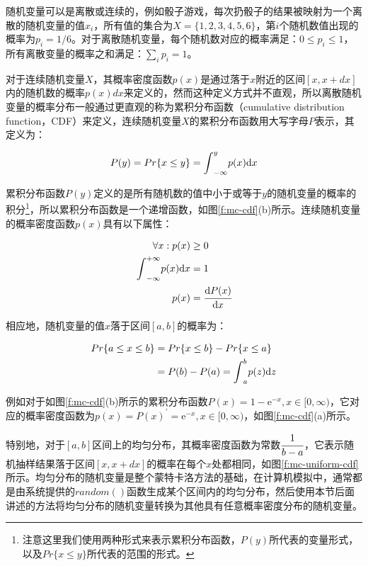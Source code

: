 随机变量可以是离散或连续的，例如骰子游戏，每次扔骰子的结果被映射为一个离散的随机变量的值$x_i$，所有值的集合为$X=\{1,2,3,4,5,6\}$，第$i$个随机数值出现的概率为$p_i=1/6$。对于离散随机变量，每个随机数对应的概率满足：$0\leq p_i \leq 1$，所有离散变量的概率之和满足：$\sum_i p_i=1$。

对于连续随机变量$X$，其概率密度函数$p(x)$是通过落于$x$附近的区间$[x,x+dx]$内的随机数的概率$p(x)dx$来定义的，然而这种定义方式并不直观，所以离散随机变量的概率分布一般通过更直观的称为累积分布函数（cumulative distribution function，CDF）来定义，连续随机变量$X$的累积分布函数用大写字母$P$表示，其定义为：

\begin{equation}
	P(y)=Pr\{x\leq y\}={\rm \int}_{-\infty}^{y}p(x){\rm d}x
\end{equation}

\noindent 累积分布函数$P(y)$定义的是所有随机数的值中小于或等于$y$的随机变量的概率的积分\footnote{注意这里我们使用两种形式来表示累积分布函数，$P(y)$所代表的变量形式，以及$Pr\{x\leq y \}$所代表的范围的形式。}，所以累积分布函数是一个递增函数，如图\ref{f:mc-cdf}(b)所示。连续随机变量的概率密度函数$p(x)$具有以下属性：

\begin{equation}\label{eq:mc-continuous-pdf}
	\begin{aligned}
		\forall x: p(x)&\geq 0\\
		{\rm \int}_{-\infty}^{+\infty}p(x){\rm d}x&=1\\
		p(x)&= \cfrac{{\rm d}P(x)}{{\rm d}x}
	\end{aligned}
\end{equation}

\noindent 相应地，随机变量的值$x$落于区间$[a,b]$的概率为：

\begin{equation}
	\begin{aligned}
		Pr\{a\leq x\leq b\}&=Pr\{x\leq b\}-Pr\{x\leq a\}\\
		&=P(b)-P(a)={\rm \int}_{a}^{b}p(z){\rm d}z
	\end{aligned}
\end{equation} 

\noindent 例如对于如图\ref{f:mc-cdf}(b)所示的累积分布函数$P(x)=1-\mathrm{e}^{-x},x\in[0,\infty)$，它对应的概率密度函数为$p(x)=P(x)^{'}=\mathrm{e}^{-x},x\in[0,\infty)$，如图\ref{f:mc-cdf}(a)所示。



特别地，对于$[a,b]$区间上的均匀分布，其概率密度函数为常数$ \cfrac{1}{b-a}$，它表示随机抽样结果落于区间$[x,x+dx]$的概率在每个$x$处都相同，如图\ref{f:mc-uniform-cdf}所示。均匀分布的随机变量是整个蒙特卡洛方法的基础，在计算机模拟中，通常都是由系统提供的$random()$函数生成某个区间内的均匀分布，然后使用本节后面讲述的方法将均匀分布的随机变量转换为其他具有任意概率密度分布的随机变量。

